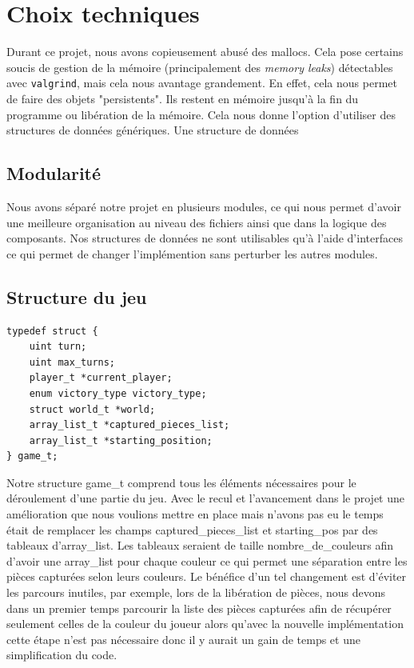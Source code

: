 \section{Choix techniques}
Durant ce projet, nous avons copieusement abusé des mallocs. Cela pose
certains soucis de gestion de la mémoire (principalement des \emph{memory leaks})
détectables avec \verb|valgrind|, mais cela nous avantage grandement.
En effet, cela nous permet de faire des
objets "persistents". Ils restent en mémoire jusqu'à la fin du programme
ou libération de la mémoire. Cela nous donne l'option d'utiliser des
structures de données génériques. Une structure de données

\subsection{Modularité}
Nous avons séparé notre projet en plusieurs modules, ce qui nous permet d'avoir une meilleure organisation au niveau des fichiers
ainsi que dans la logique des composants. Nos structures de données ne sont utilisables qu'à l'aide d'interfaces ce qui permet de changer
l'implémention sans perturber les autres modules. 


\subsection{Structure du jeu}

\begin{verbatim}
typedef struct {
    uint turn;
    uint max_turns;
    player_t *current_player;
    enum victory_type victory_type;
    struct world_t *world;
    array_list_t *captured_pieces_list;
    array_list_t *starting_position;
} game_t;
\end{verbatim}


Notre structure game\_t comprend tous les éléments nécessaires pour le déroulement
d'une partie du jeu.
Avec le recul et l'avancement dans le projet une amélioration que nous voulions mettre en place mais n'avons
pas eu le temps était de remplacer les champs captured\_pieces\_list et starting\_pos par des tableaux d'array\_list.
Les tableaux seraient de taille nombre\_de\_couleurs afin d'avoir une array\_list pour chaque couleur ce qui permet
une séparation entre les pièces capturées selon leurs couleurs. Le bénéfice d'un tel changement est 
d'éviter les parcours inutiles, par exemple, lors de la libération de pièces, nous devons dans un premier temps
parcourir la liste des pièces capturées afin de récupérer seulement celles de la couleur du joueur alors
qu'avec la nouvelle implémentation cette étape n'est pas nécessaire donc il y aurait un gain de temps et
une simplification du code.  


